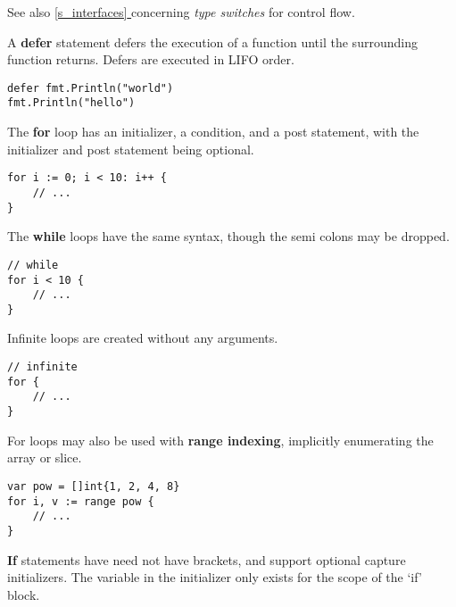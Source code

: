 \documentclass{article}
\newcommand{\fullref}[1]{\hyperref[{#1}]{\ref{#1} \nameref{#1}}}
\begin{document}
See also \fullref{s_interfaces} concerning \textit{type switches} for control flow.
\\
\begin{paracol}{2}
\noindent A \textbf{defer} statement defers the execution of a function until the surrounding function returns. Defers are executed in LIFO order.
\\
\switchcolumn


\begin{lstlisting}
defer fmt.Println("world")
fmt.Println("hello")
\end{lstlisting}



\switchcolumn*
\noindent The \textbf{for} loop has an initializer, a condition, and a post statement, with the initializer and post statement being optional.

\switchcolumn

\begin{lstlisting}
for i := 0; i < 10: i++ {
    // ...
}
\end{lstlisting}


\switchcolumn*

\noindent The \textbf{while} loops have the same syntax, though the semi colons may be dropped.

\switchcolumn

\begin{lstlisting}
// while
for i < 10 {
    // ...
}
\end{lstlisting}


\switchcolumn*
\noindent Infinite loops are created without any arguments.

\switchcolumn

\begin{lstlisting}
// infinite
for {
    // ...
}
\end{lstlisting}


\switchcolumn*

\noindent For loops may also be used with \textbf{range indexing}, implicitly enumerating the array or slice.

\switchcolumn

\begin{lstlisting}
var pow = []int{1, 2, 4, 8}
for i, v := range pow {
    // ...
}
\end{lstlisting}



\switchcolumn*

\noindent \textbf{If} statements have need not have brackets, and support optional capture initializers. The variable in the initializer only exists for the scope of the `if' block.


\end{paracol}
\end{document}
